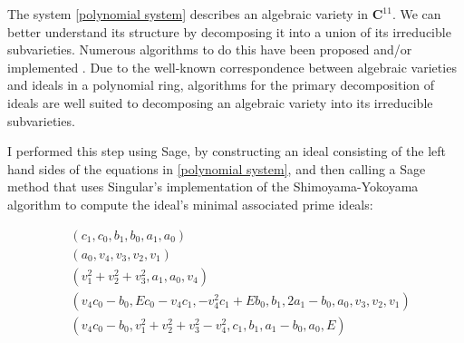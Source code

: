 \documentclass{article}
\begin{document}
The system \eqref{polynomial system} describes an algebraic variety in ${\mathbf C}^{11}$.
We can better understand its structure by decomposing it into a union
of its irreducible subvarieties.  Numerous algorithms to do this
have been proposed and/or implemented \cite{Bertini, EHV, GTZ, Schönemann, SY, Ritt, Wu}.
Due to the well-known correspondence between algebraic varieties and ideals in a polynomial ring,
algorithms for the primary decomposition of ideals are well suited to decomposing
an algebraic variety into its irreducible subvarieties.

I performed this step using Sage, by constructing an ideal consisting of the
left hand sides of the equations in \eqref{polynomial system}, and
then calling a Sage method that uses Singular's implementation of the Shimoyama-Yokoyama algorithm\cite{SY}
to compute the ideal's minimal associated prime ideals:

\begin{subequations}
\label{ideal}
\begin{align}
& \left(c_{1}, c_{0}, b_{1}, b_{0}, a_{1}, a_{0}\right) \label{ideal:3} \\
& \left(a_{0}, v_{4}, v_{3}, v_{2}, v_{1}\right) \label{ideal:1} \\
& \left(v_{1}^{2} + v_{2}^{2} + v_{3}^{2}, a_{1}, a_{0}, v_{4}\right) \label{ideal:4} \\
& \left(v_{4} c_{0} - b_{0}, E c_{0} - v_{4} c_{1}, -v_{4}^{2} c_{1} + E b_{0}, b_{1}, 2 a_{1} - b_{0}, a_{0}, v_{3}, v_{2}, v_{1}\right) \label{ideal:2} \\
& \left(v_{4} c_{0} - b_{0}, v_{1}^{2} + v_{2}^{2} + v_{3}^{2} - v_{4}^{2}, c_{1}, b_{1}, a_{1} - b_{0}, a_{0}, E\right) \label{ideal:5}
\end{align}
\end{subequations}
\end{document}

